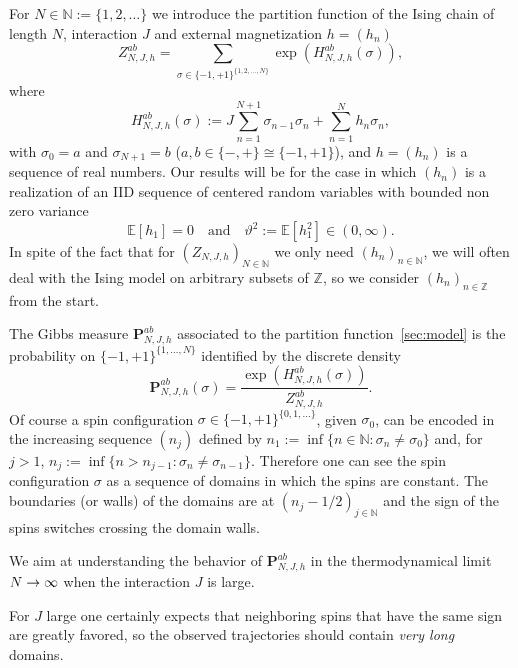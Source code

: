 \documentclass[10pt]{amsart}
\theoremstyle{definition}\newtheorem{defi}[theo]{Definition}\newtheorem{rema}[theo]{Remark}\newtheorem{exam}[theo]{Example}\newtheorem{exem}[theo]{Example}\newtheorem{nota}[theo]{Notation}
\newcommand{\bP}{\mathbf{P}}
\newcommand{\bbE}{\mathbb{E}}
\newcommand{\bbN}{\mathbb{N}}
\newcommand{\bbZ}{\mathbb{Z}}
\newcommand{\gs}{\sigma}
\renewcommand*{\to}{\mathchoice{\longrightarrow}{\rightarrow}{\rightarrow}{\rightarrow}}
\begin{document}
For $N\in \bbN:=\{1,2, \dots\}$ we introduce the partition function of the Ising chain of length $N$, interaction $J$ and external magnetization $h=(h_n)$
\begin{equation}\label{eq:ZRFIC}
Z_{N, J, h}^{ab}=
\sum_{\gs \in \{-1, +1\}^{\{1,2,\dots, N\}}} \exp\left(H^{ab}_{N, J, h}(\gs)\right),
\end{equation}
where
\begin{equation}\label{eq:HRFIC}
H^{ab}_{N, J, h}(\gs) := J\sum_{n=1}^{N+1} \gs _{n-1} \gs_{n} + \sum_{n=1}^{N} h_n \gs_n,
\end{equation}
with $\gs_0=a$ and $\gs_{N+1}=b$ ($a,b \in\{ -, +\}\cong\{-1,+1\}$), and $h=(h_n)$ is a sequence of real numbers. Our results will be for the case in which $(h_n)$ is a realization of an IID sequence of centered random variables with bounded non zero variance
\begin{equation}\label{hyp-S}
\bbE[h_1]=0 \quad \text{and}\quad \vartheta^2:= \bbE\left[h_1^2\right] \in (0, \infty).
\end{equation}
In spite of the fact that for $(Z_{N, J, h})_{N \in \bbN}$ we only need $(h_n)_{n \in \bbN}$, we will often deal with the Ising model on arbitrary subsets of $\bbZ$, so we consider $(h_n)_{n \in \bbZ}$ from the start.



The Gibbs measure $\bP^{ab}_{N, J, h}$ associated to the partition function~\eqref{sec:model} is the probability on $\{-1, +1\}^{\{1,\dots, N\}}$ identified by the discrete density
\begin{equation}\label{eq:Gibbs}
\bP^{ab}_{N, J, h}\left(\gs \right) = \frac{\exp\left(H^{ab}_{N, J, h}(\gs)\right) }{Z_{N, J, h}^{ab}} .
\end{equation}
Of course a spin configuration $\gs \in \{-1,+1\}^{\{0,1,\dots\}}$, given $\gs_0$, can be encoded in the increasing sequence $(n_j)$ defined by $n_1:=
\inf\{n\in \bbN: \gs_n\neq \gs_0\}$ and, for $j>1$, $n_j:=\inf\{n > n_{j-1}: \gs_n \neq \gs_{n-1}\}$. Therefore one can see the spin configuration $\gs$ as a sequence of domains in which the spins are constant. The boundaries (or walls) of the domains are at $(n_j-1/2)_{j \in \bbN}$ and the sign of the spins switches crossing the domain walls.

We aim at understanding the behavior of $\bP^{ab}_{N, J, h}$ in the thermodynamical limit $N \to \infty$ when the interaction $J$ is large.

For $J$ large one certainly expects that neighboring spins that have the same sign are greatly favored, so the observed trajectories should contain \emph{very long} domains.
\end{document}
